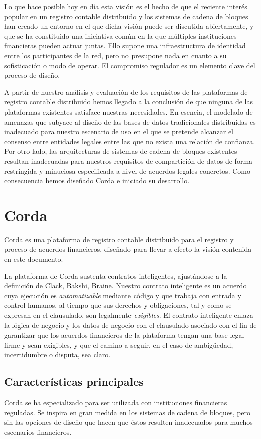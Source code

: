 \documentclass{article}
\begin{document}
Lo que hace posible hoy en día esta visión es el hecho de que el reciente interés popular en un registro contable distribuido y los sistemas de cadena de bloques han creado un entorno en el que dicha visión puede ser discutida abiertamente, y que se ha constituido una iniciativa común en la que múltiples instituciones financieras pueden actuar juntas. Ello supone una infraestructura de identidad entre los participantes de la red, pero no presupone nada en cuanto a su sofisticación o modo de operar. El compromiso regulador es un elemento clave del proceso de diseño.

A partir de nuestro análisis y evaluación de los requisitos de las plataformas de registro contable distribuido hemos llegado a la conclusión de que ninguna de las plataformas existentes satisface nuestras necesidades.  En esencia, el modelado de amenazas que subyace al diseño de las bases de datos tradicionales distribuidas es inadecuado para nuestro escenario de uso en el que se pretende alcanzar el consenso entre entidades legales entre las que no exista una relación de confianza. Por otro lado, las arquitecturas de sistemas de cadena de bloques existentes resultan inadecuadas para nuestros requisitos de compartición de datos de forma restringida y minuciosa especificada a nivel de acuerdos legales concretos.  Como consecuencia hemos diseñado Corda e iniciado su desarrollo.

\section{Corda}
Corda es una plataforma de registro contable distribuido para el registro y proceso de acuerdos financieros, diseñado para llevar a efecto la visión contenida en este documento.  

La plataforma de Corda sustenta contratos inteligentes, ajustándose a la definición de Clack, Bakshi, Braine.\cite{SCT} Nuestro contrato inteligente es un acuerdo cuya ejecución es \textit{automatizable} mediante código y que trabaja con entrada y control humanos, al tiempo que sus derechos y obligaciones, tal y como se expresan en el clausulado, son legalmente \textit{exigibles}.  El contrato inteligente enlaza la lógica de negocio y los datos de negocio con el clausulado asociado con el fin de garantizar que los acuerdos financieros de la plataforma tengan una base legal firme y sean exigibles, y que el camino a seguir, en el caso de ambigüedad, incertidumbre o disputa, sea claro.

\subsection{Características principales}
Corda se ha especializado para ser utilizada con instituciones financieras reguladas. Se inspira en gran medida en los sistemas de cadena de bloques, pero sin las opciones de diseño que hacen que éstos resulten inadecuados para muchos escenarios financieros. 
\end{document}
